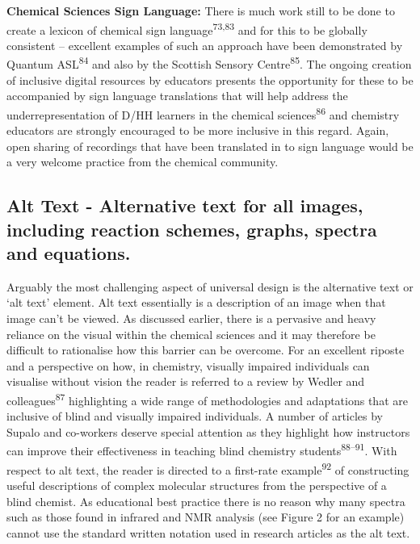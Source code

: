 \documentclass[11.5pt]{sig-alternate} %
\begin{document}
\begin{large}
\textbf{Chemical Sciences Sign Language:} There is much work still to be done to create a lexicon of chemical sign language\textsuperscript{73,83} and for this to be globally consistent – excellent examples of such an approach have been demonstrated by Quantum ASL\textsuperscript{84} and also by the Scottish Sensory Centre\textsuperscript{85}. The ongoing creation of inclusive digital resources by educators presents the opportunity for these to be accompanied by sign language translations that will help address the underrepresentation of D/HH learners in the chemical sciences\textsuperscript{86} and chemistry educators are strongly encouraged to be more inclusive in this regard. Again, open sharing of recordings that have been translated in to sign language would be a very welcome practice from the chemical community.

\subsection*{Alt Text - Alternative text for all images, including reaction schemes, graphs, spectra and equations.}

Arguably the most challenging aspect of universal design is the alternative text or ‘alt text’ element. Alt text essentially is a description of an image when that image can’t be viewed. As discussed earlier, there is a pervasive and heavy reliance on the visual within the chemical sciences and it may therefore be difficult to rationalise how this barrier can be overcome. For an excellent riposte and a perspective on how, in chemistry, visually impaired individuals can visualise without vision the reader is referred to a review by Wedler and colleagues\textsuperscript{87} highlighting a wide range of methodologies and adaptations that are inclusive of blind and visually impaired individuals. A number of articles by Supalo and co-workers deserve special attention as they highlight how instructors can improve their effectiveness in teaching blind chemistry students\textsuperscript{88–91}.  With respect to alt text, the reader is directed to a first-rate example\textsuperscript{92} of constructing useful descriptions of complex molecular structures from the perspective of a blind chemist. As educational best practice there is no reason why many spectra such as those found in infrared and NMR analysis (see Figure 2 for an example) cannot use the standard written notation used in research articles as the alt text. 


\end{large}
\end{document}
